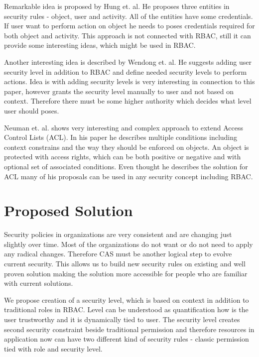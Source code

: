 \documentclass{sig-alternate}
\begin{document}
Remarkable idea is proposed by Hung et. al. \cite{hung} He proposes three entities in security rules - object, user and activity. All of the entities have some credentials. If user want to perform action on object he needs to poses credentials required for both object and activity. This approach is not connected with RBAC, still it can provide some interesting ideas, which might be used in RBAC.

Another interesting idea is described by Wendong et. al. \cite{wendong} He suggests adding user security level in addition to RBAC and define needed security levels to perform actions. Idea is with adding security levels is very interesting in connection to this paper, however grants the security level manually to user and not based on context. Therefore there must be some higher authority which decides what level user should poses.

Neuman et. al. \cite{eacl} shows very interesting and complex approach to extend Access Control Lists (ACL). In his paper he describes multiple conditions including context constrains and the way they should be enforced on objects. An object is protected with access rights, which can be both positive or negative and with optional set of associated conditions. Even thought he describes the solution for ACL many of his proposals can be used in any security concept including RBAC.

\section{Proposed Solution}
Security policies in organizations are very consistent and are changing just slightly over time. Most of the organizations do not want or do not need to apply any radical changes. Therefore CAS must be another logical step to evolve current security. This allows us to build new security rules on existing and well proven solution making the solution more accessible for people who are familiar with current solutions.

We propose creation of a security level, which is based on context in addition to traditional roles in RBAC. Level can be understood as quantification how is the user trustworthy and it is dynamically tied to user. The security level creates second security constraint beside traditional permission and therefore resources in application now can have two different kind of security rules - classic permission tied with role and security level.

\end{document}
